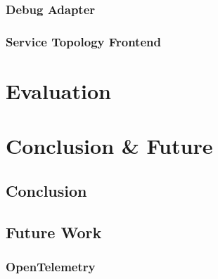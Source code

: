 \documentclass[12pt,pdftex,titlepage]{report}
\begin{document}
            \subsection{Debug Adapter}
            \subsection{Service Topology Frontend}
            

    \chapter{Evaluation}

    
    \chapter{Conclusion \& Future}
        \section{Conclusion}

        \section{Future Work}
            \subsection{OpenTelemetry}
\end{document}
